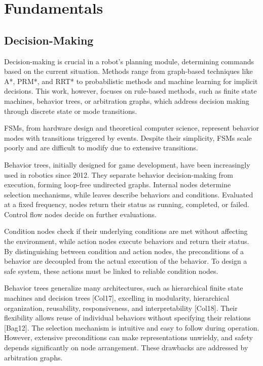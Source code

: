 
\section{Fundamentals}


\subsection{Decision-Making}

Decision-making is crucial in a robot's planning module, determining commands based on the current situation.
Methods range from graph-based techniques like A*, PRM*, and RRT* to probabilistic methods and machine learning for implicit decisions.
This work, however, focuses on rule-based methods, such as finite state machines, behavior trees, or arbitration graphs, which address decision making through discrete state or mode transitions.

FSMs, from hardware design and theoretical computer science, represent behavior modes with transitions triggered by events. Despite their simplicity, FSMs scale poorly and are difficult to modify due to extensive transitions.

Behavior trees, initially designed for game development, have been increasingly used in robotics since 2012.
They separate behavior decision-making from execution, forming loop-free undirected graphs.
Internal nodes determine selection mechanisms, while leaves describe behaviors and conditions.
Evaluated at a fixed frequency, nodes return their status as running, completed, or failed.
Control flow nodes decide on further evaluations.

Condition nodes check if their underlying conditions are met without affecting the environment, while action nodes execute behaviors and return their status.
By distinguishing between condition and action nodes, the preconditions of a behavior are decoupled from the actual execution of the behavior.
To design a safe system, these actions must be linked to reliable condition nodes.

Behavior trees generalize many architectures, such as hierarchical finite state machines and decision trees [Col17], excelling in modularity, hierarchical organization, reusability, responsiveness, and interpretability [Col18].
Their flexibility allows reuse of individual behaviors without specifying their relations [Bag12].
The selection mechanism is intuitive and easy to follow during operation.
However, extensive preconditions can make representations unwieldy, and safety depends significantly on node arrangement.
These drawbacks are addressed by arbitration graphs.

